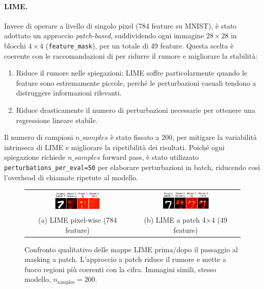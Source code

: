 \documentclass[12pt,a4paper,oneside]{report}
\numberwithin{figure}{chapter}
\numberwithin{table}{chapter}
\begin{document}
\paragraph{LIME.}
Invece di operare a livello di singolo pixel (784 feature su MNIST), è stato
adottato un approccio \textit{patch-based}, suddividendo ogni immagine
$28\times28$ in blocchi $4\times4$ (\texttt{feature\_mask}), per un totale di
49 feature. Questa scelta è coerente con le raccomandazioni di
\citet{ribeiro2016lime} per ridurre il rumore e migliorare la stabilità:
\begin{enumerate}
      \item Riduce il rumore nelle spiegazioni: LIME soffre particolarmente quando le
            feature sono estremamente piccole, perché le perturbazioni casuali tendono a
            distruggere informazioni rilevanti.
      \item Riduce drasticamente il numero di perturbazioni necessarie per ottenere una
            regressione lineare stabile.
\end{enumerate}
Il numero di campioni $n\_samples$ è stato fissato a 200, per mitigare la variabilità intrinseca di LIME e migliorare la ripetibilità dei risultati.
Poiché ogni spiegazione richiede $n\_samples$ forward pass, è stato utilizzato \texttt{perturbations\_per\_eval=50} per elaborare perturbazioni in batch, riducendo così l’overhead di chiamate ripetute al modello.

\begin{figure}[htbp]
      \centering
      \setlength{\tabcolsep}{4pt}
      \begin{tabular}{cc}
            \includegraphics[width=0.45\textwidth]{images/lime_pixelwise.png} &
            \includegraphics[width=0.45\textwidth]{images/lime_patch.png}                                                       \\
            \small (a) LIME pixel-wise (784 feature)                          & \small (b) LIME a patch 4$\times$4 (49 feature)
      \end{tabular}
      \caption{Confronto qualitativo delle mappe LIME prima/dopo il passaggio al masking a patch.
            L’approccio a patch riduce il rumore e mette a fuoco regioni più coerenti con la cifra.
            Immagini simili, stesso modello, $n_\mathrm{samples}=200$.}
      \label{fig:lime_before_after}
\end{figure}
\end{document}
